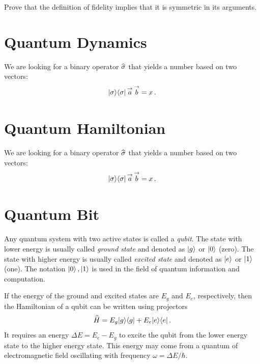 \begin{exercise}
	Prove that the definition of fidelity implies that it is symmetric in its arguments.
\end{exercise}

\section{Quantum Dynamics}\label{sec:QuantumDynamics}
We are looking for a binary operator $\widehat{\sigma}$ that yields a number
based on two vectors:
\[
|{\sigma}\rangle\langle{\sigma}|\,\overset{\rightarrow}{a}\,\overset{\rightarrow}{b}=x\,.
\]

\section{Quantum Hamiltonian}\label{sec:QuantumHamiltonian}
We are looking for a binary operator $\widehat{\sigma}$ that yields a number
based on two vectors:
\[
|{\sigma}\rangle\langle{\sigma}|\,\overset{\rightarrow}{a}\,\overset{\rightarrow}{b}=x\,.
\]


\section{Quantum Bit}\label{sec:Qubit}
Any quantum system with two active states is called a \emph{qubit}. The state with lower energy is usually called \emph{ground state} and denoted as $|{g}\rangle$ or $|{0}\rangle$ (zero). The state with higher energy is usually called \emph{excited state} and denoted as $|{e}\rangle$ or $|{1}\rangle$ (one). The notation $|{0}\rangle\,,|{1}\rangle$ is used in the field of quantum information and computation.

If the energy of the ground and excited states are $E_g$ and $E_e$, respectively, then the Hamiltonian of a qubit can be written using projectors
\[
\widehat{H} = E_g|{g}\rangle\langle{g}|+E_e|{e}\rangle\langle{e}|\,.
\]
It requires an energy $\Delta E=E_e-E_g$ to excite the qubit from the lower energy state to the higher energy state. This energy may come from a quantum of electromagnetic field oscillating with frequency $\omega=\Delta E/\hbar$.

